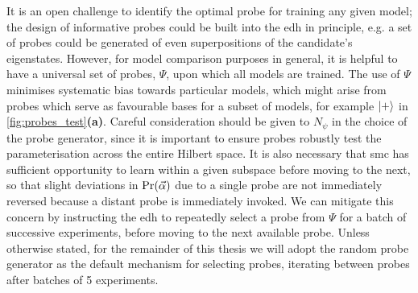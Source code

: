 It is an open challenge to identify the optimal \gls{probe} for training any given model;
the design of informative probes could be built into the \gls{edh} in principle,
e.g. a set of \glspl{probe} could be generated of even superpositions of the candidate's eigenstates.
However, for model comparison purposes in general, 
it is helpful to have a universal set of probes, $\Psi$, upon which all models are trained. 
The use of $\Psi$ minimises systematic bias towards particular models, 
which might arise from probes which serve as favourable bases for a subset of models, 
for example $\ket{+}$ in \cref{fig:probes_test}\textbf{(a)}. 
Careful consideration should be given to $N_{\psi}$ in the choice of the \gls{probe} generator, 
since it is important to ensure probes robustly test the parameterisation across the entire Hilbert space.
It is also necessary that \gls{smc} has sufficient opportunity to learn within a given subspace before moving to the next, 
so that slight deviations in $\Pr(\vec{\alpha})$ due to a single probe are not immediately reversed because a distant probe is immediately invoked. 
We can mitigate this concern by instructing the \gls{edh} to repeatedly select a \gls{probe} from $\Psi$ for a batch of successive \glspl{experiment}, 
before moving to the next available probe. 
Unless otherwise stated, for the remainder of this thesis we will adopt the random \gls{probe} 
generator as the default mechanism for selecting probes,
iterating between probes after batches of 5 \glspl{experiment}.
